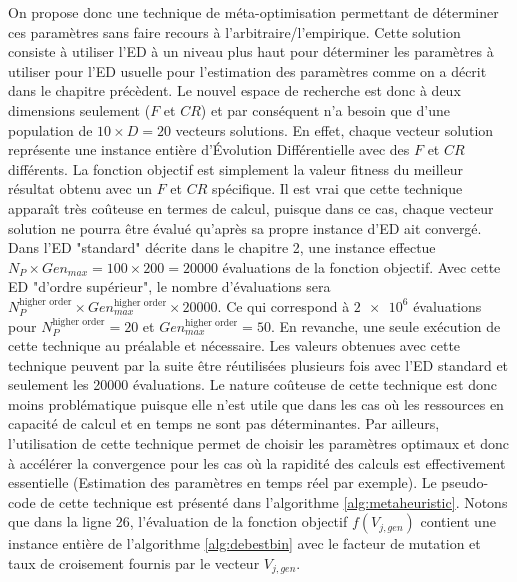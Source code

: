 On propose donc une technique de méta-optimisation permettant de déterminer ces paramètres sans faire recours à l'arbitraire/l'empirique. Cette solution consiste à utiliser l'ED à un niveau plus haut pour déterminer les paramètres à utiliser pour l'ED usuelle pour l'estimation des paramètres comme on a décrit dans le chapitre précèdent. Le nouvel espace de recherche est donc à deux dimensions seulement ($F$ et $CR$) et par conséquent n'a besoin que d'une population de $10 \times D = 20$ vecteurs solutions. En effet, chaque vecteur solution représente une instance entière d'Évolution Différentielle avec des $F$ et $CR$ différents. La fonction objectif est simplement la valeur fitness du meilleur résultat obtenu avec un $F$ et $CR$ spécifique. Il est vrai que cette technique apparaît très coûteuse en termes de calcul, puisque dans ce cas, chaque vecteur solution ne pourra être évalué qu'après sa propre instance d'ED ait convergé. Dans l'ED "standard" décrite dans le chapitre 2, une instance effectue $N_P \times Gen_{max} = 100 \times 200 = 20000$ évaluations de la fonction objectif. Avec cette ED "d'ordre supérieur", le nombre d'évaluations sera $N_{P}^{\text{higher order}} \times Gen_{max}^{\text{higher order}} \times 20000$. Ce qui correspond à $\num{2e6}$ évaluations pour $N_{P}^{\text{higher order}} = 20$ et  $Gen_{max}^{\text{higher order}} = 50$. En revanche, une seule exécution de cette technique au préalable et nécessaire. Les valeurs obtenues avec cette technique peuvent par la suite être réutilisées plusieurs fois avec l'ED standard et seulement les 20000 évaluations. Le nature coûteuse de cette technique est donc moins problématique puisque elle n'est utile que dans les cas où les ressources en capacité de calcul et en temps ne sont pas déterminantes. Par ailleurs, l'utilisation de cette technique permet de choisir les paramètres optimaux et donc à accélérer la convergence pour les cas où la rapidité des calculs est effectivement essentielle (Estimation des paramètres en temps réel par exemple). Le pseudo-code de cette technique est présenté dans l'algorithme \ref{alg:metaheuristic}. Notons que dans la ligne 26, l'évaluation de la fonction objectif $f(V_{j,gen})$ contient une instance entière de l'algorithme \ref{alg:debestbin} avec le facteur de mutation et taux de croisement fournis par le vecteur $V_{j,gen}$.\\

